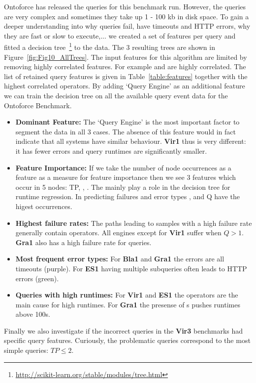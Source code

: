 Ontoforce has released the queries for this benchmark run. However, the queries are very complex and sometimes they take up 1 - 100 kb in disk space. To gain a deeper understanding into why queries fail, have timeouts and HTTP errors, why they are fast or slow to execute,... we created a set of features per query and fitted a decision tree~\footnote{\scriptsize \url{http://scikit-learn.org/stable/modules/tree.html}} to the data. The 3 resulting trees are shown in Figure~\ref{fig:Fig10_AllTrees}. The input features for this algorithm are limited by removing highly correlated features. For example  and  are highly correlated. The list of retained query features is given in Table~\ref{table:features} together with the highest correlated operators.
By adding `Query Engine' as an additional feature we can train the decision tree on all the available query event data for the Ontoforce Benchmark. 
\begin{itemize}
	\item \textbf{Dominant Feature:} The `Query Engine' is the most important factor to segment the data in all 3 cases. The absence of this feature would in fact indicate that all systems have similar behaviour. \textbf{Vir1} thus is very different: it has fewer errors and query runtimes are significantly smaller.
	\item \textbf{Feature Importance:} If we take the number of node occurrences as a feature as a measure for feature importance then we see 3 features which occur in 5 nodes: TP, , . The  mainly play a role in the decision tree for runtime regression. In predicting failures and error types ,  and Q have the higest occurrences.
	\item \textbf{Highest failure rates:} The paths leading to samples with a high failure rate generally contain  operators. All engines except for \textbf{Vir1} suffer when $Q > 1$. \textbf{Gra1} also has a high failure rate for  queries.
	\item \textbf{Most frequent error types:} For \textbf{Bla1} and \textbf{Gra1} the errors are all timeouts (purple). For \textbf{ES1} having multiple subqueries often leads to HTTP errors (green). 
	\item \textbf{Queries with high runtimes:} For \textbf{Vir1} and \textbf{ES1} the  operators are the main cause for high runtimes. For \textbf{Gra1} the presense of s pushes runtimes above 100s. 
\end{itemize}

Finally we also investigate if the incorrect queries in the \textbf{Vir3} benchmarks had specific query features. Curiously, the problematic queries correspond to the most simple queries: $TP \leq 2$.	
